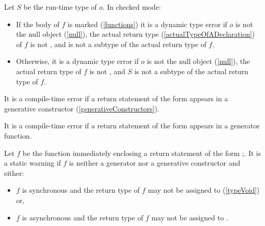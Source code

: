 \documentclass{article}
\begin{document}
\LMHash{}
Let $S$ be the run-time type of $o$.
In checked mode:
\begin{itemize}
\item If the body of $f$ is marked \ASYNC{} (\ref{functions})
it is a dynamic type error if $o$ is not the null object (\ref{null}),
the actual return type (\ref{actualTypeOfADeclaration}) of $f$ is not \VOID,
and  is not a subtype of the actual return type of $f$.
\item Otherwise, it is a dynamic type error if $o$ is not the null object (\ref{null}),
the actual return type of $f$ is not \VOID{},
and $S$ is not a subtype of the actual return type of $f$.
\end{itemize}

\LMHash{}
It is a compile-time error if a return statement of the form  appears in a generative constructor (\ref{generativeConstructors}).


\LMHash{}
It is a compile-time error if a return statement of the form  appears in a generator function.


\LMHash{}
Let $f$ be the function immediately enclosing a return statement of the form \RETURN{};.
It is a static warning if $f$ is neither a generator nor a generative constructor and either:
\begin{itemize}
\item $f$ is synchronous and the return type of $f$ may not be assigned to \VOID{} (\ref{typeVoid}) or,
\item $f$ is asynchronous and the return type of $f$ may not be assigned to .
\end{itemize}
\end{document}
